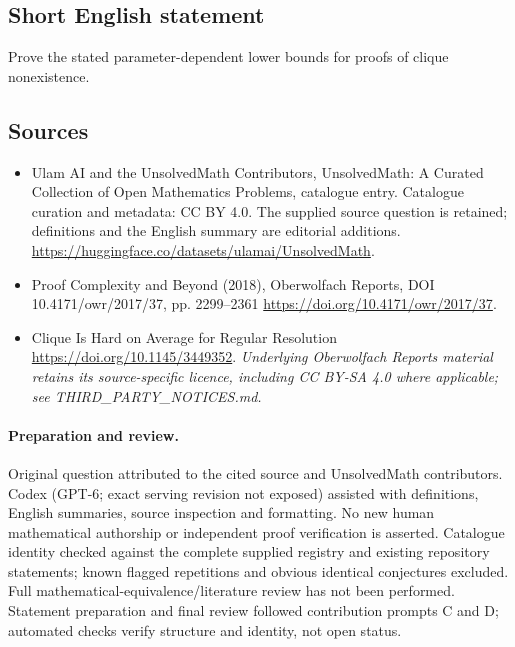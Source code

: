 \documentclass[11pt]{article}
\begin{document}
\subsection{Short English statement}
Prove the stated parameter-dependent lower bounds for proofs of clique nonexistence.
\subsection{Sources}
\begin{itemize}
\item[\hypertarget{source:statement:1}{S1}] Ulam AI and the UnsolvedMath Contributors, UnsolvedMath: A Curated Collection of Open Mathematics Problems, catalogue entry. Catalogue curation and metadata: CC BY 4.0. The supplied source question is retained; definitions and the English summary are editorial additions.
\url{https://huggingface.co/datasets/ulamai/UnsolvedMath}.
\item[\hypertarget{source:statement:2}{S2}] Proof Complexity and Beyond (2018), Oberwolfach Reports, DOI 10.4171/owr/2017/37, pp. 2299--2361
\url{https://doi.org/10.4171/owr/2017/37}.
\item[\hypertarget{source:statement:3}{S3}] Clique Is Hard on Average for Regular Resolution
\url{https://doi.org/10.1145/3449352}.
\textit{Underlying Oberwolfach Reports material retains its source-specific licence, including CC BY-SA 4.0 where applicable; see THIRD\_PARTY\_NOTICES.md.}
\end{itemize}
\paragraph{Preparation and review.}
Original question attributed to the cited source and UnsolvedMath contributors. Codex (GPT-6; exact serving revision not exposed) assisted with definitions, English summaries, source inspection and formatting. No new human mathematical authorship or independent proof verification is asserted. Catalogue identity checked against the complete supplied registry and existing repository statements; known flagged repetitions and obvious identical conjectures excluded. Full mathematical-equivalence/literature review has not been performed. Statement preparation and final review followed contribution prompts C and D; automated checks verify structure and identity, not open status.
\label{end:statement}
\end{document}
